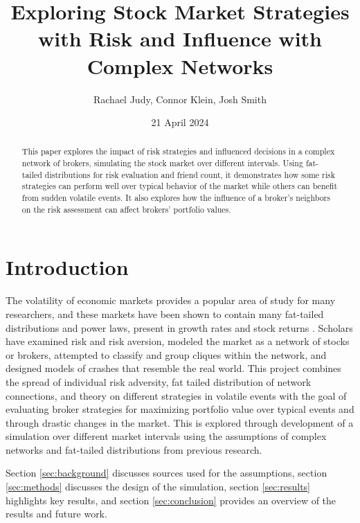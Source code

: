 \documentclass[letterpaper, 11 pt, proceedings]{IEEEtran}
\title{Exploring Stock Market Strategies with Risk and Influence with Complex Networks}
\author{Rachael Judy, Connor Klein, Josh Smith}
\date{21 April 2024}
\begin{document}
	\pgfplotsset{compat=1.18}
	
	\maketitle

	\begin{abstract}
		This paper explores the impact of risk strategies and influenced decisions in a complex network of brokers, simulating the stock market over different intervals. Using fat-tailed distributions for risk evaluation and friend count, it demonstrates how some risk strategies can perform well over typical behavior of the market while others can benefit from sudden volatile events. It also explores how the influence of a broker's neighbors on the risk assessment can affect brokers' portfolio values. 
	\end{abstract}


	\section{Introduction}\label{sec:intro}
	The volatility of economic markets provides a popular area of study for many researchers, and these markets have been shown to contain many fat-tailed distributions and power laws, present in growth rates and stock returns \cite{gabaix_powerlaws}. Scholars have examined risk and risk aversion, modeled the market as a network of stocks or brokers, attempted to classify and group cliques within the network, and designed models of crashes that resemble the real world. This project combines the spread of individual risk adversity, fat tailed distribution of network connections, and theory on different strategies in volatile \cite{taleb_antifragile} events with the goal of evaluating broker strategies for maximizing portfolio value over typical events and through drastic changes in the market. This is explored through development of a simulation over different market intervals using the assumptions of complex networks and fat-tailed distributions from previous research.
	
	Section \ref{sec:background} discusses sources used for the assumptions, section \ref{sec:methods} discusses the design of the simulation, section \ref{sec:results} highlights key results, and section \ref{sec:conclusion} provides an overview of the results and future work.
	
\end{document}
